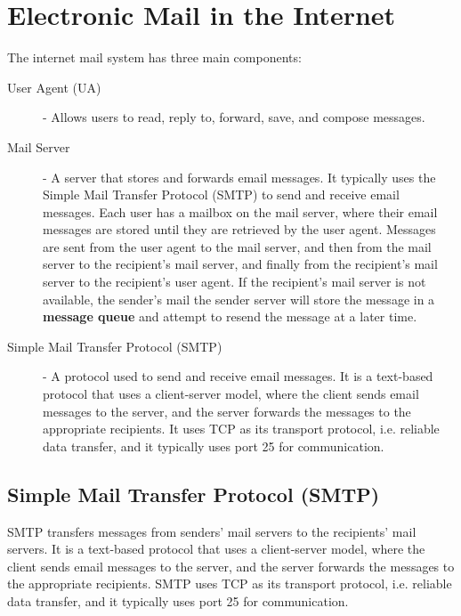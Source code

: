 \documentclass[12pt letter]{report}
\begin{document}
\chapter{Electronic Mail in the Internet}

The internet mail system has three main components:
\begin{description}
  \item[User Agent (UA)] -  Allows users to read, reply to, forward,
    save, and compose messages.
  \item[Mail Server] - A server that stores and forwards email messages. It
    typically uses the Simple Mail Transfer Protocol (SMTP) to send
    and receive email messages. Each user has a mailbox on the mail
    server, where their email messages are stored until they are
    retrieved by the user agent. Messages are sent from the user
    agent to the mail server, and then from the mail server to the
    recipient's mail server, and finally from the recipient's mail
    server to the recipient's user agent. If the recipient's mail
    server is not available, the sender's mail the sender server will
    store the message in a \textbf{message queue} and attempt to
    resend the message at a later time.
  \item[Simple Mail Transfer Protocol (SMTP)] - A protocol used to
    send and receive email messages. It is a text-based protocol that
    uses a client-server model, where the client sends email messages
    to the server, and the server forwards the messages to the
    appropriate recipients. It uses TCP as its transport protocol,
    i.e. reliable data transfer, and it typically uses port 25 for
    communication.
\end{description}

\section{Simple Mail Transfer Protocol (SMTP)}

SMTP transfers messages from senders' mail servers to the recipients'
mail servers. It is a text-based protocol that uses a client-server
model, where the client sends email messages to the
server, and the server forwards the messages to the appropriate
recipients. SMTP uses TCP as its transport protocol, i.e. reliable
data transfer, and it typically uses port 25 for communication.
\end{document}

